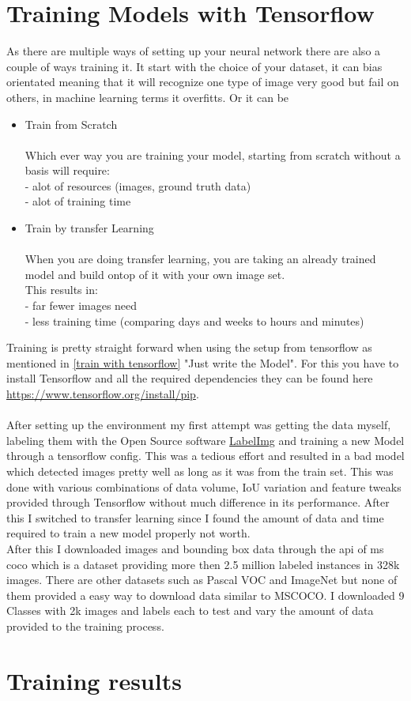\section{Training Models with Tensorflow} \label{models with tensorflow}
As there are multiple ways of setting up your neural network there are also a couple of ways training it. It start with the choice of your
dataset, it can bias orientated meaning that it will recognize one type of image very good but fail on others, in machine learning terms it
overfitts. Or it can be 
\begin{itemize}
    \item Train from Scratch \\ \\
        Which ever way you are training your model, starting from scratch without a basis will require: \\
        {- alot of resources (images, ground truth data)} \\
        {- alot of training time} \\
    \item Train by transfer Learning \\ \\
        When you are doing transfer learning, you are taking an already trained model and build ontop of it with your own image set.\\
        This results in: \\
        {- far fewer images need} \\
        {- less training time (comparing days and weeks to hours and minutes)} \\
\end{itemize}
Training is pretty straight forward when using the setup from tensorflow as mentioned in \ref{train with tensorflow} "Just write the Model".
For this you have to install Tensorflow and all the required dependencies they can be found here
\url{https://www.tensorflow.org/install/pip}. \\ \\
After setting up the environment my first attempt was getting the data myself, labeling them with the Open Source software
\href{https://github.com/tzutalin/labelImg}{LabelImg} and training a new Model through a tensorflow config. This was a tedious effort and
resulted in a bad model which detected images pretty well as long as it was from the train set. This was done with various combinations of
data volume, IoU variation and feature tweaks provided through Tensorflow without much difference in its performance.  After this I switched
to transfer learning since I found the amount of data and time required to train a new model properly not worth. \\ 
After this I downloaded images and bounding box data through the api of ms coco which is a dataset providing more then 2.5 million labeled
instances in 328k images.\cite{mscoco} There are other datasets such as Pascal VOC and ImageNet but none of them provided a easy way to
download data similar to MSCOCO. I downloaded 9 Classes with 2k images and labels each to test and vary the amount of data provided to the
training process.

\section{Training results}




